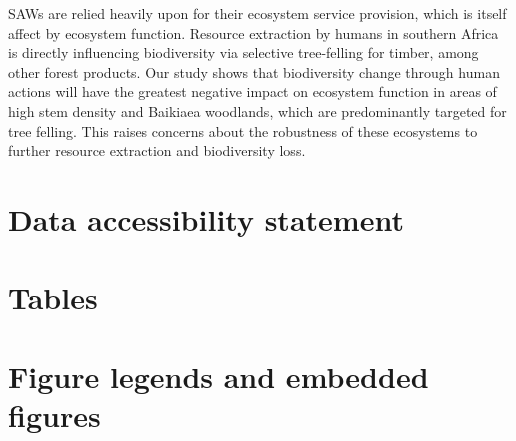 \documentclass[11pt,a4paper]{article}
\begin{document}
SAWs are relied heavily upon for their ecosystem service provision, which is itself affect by ecosystem function. Resource extraction by humans in southern Africa is directly influencing biodiversity via selective tree-felling for timber, among other forest products. Our study shows that biodiversity change through human actions will have the greatest negative impact on ecosystem function in areas of high stem density and Baikiaea woodlands, which are predominantly targeted for tree felling. This raises concerns about the robustness of these ecosystems to further resource extraction and biodiversity loss.




\newpage{}
\appendix{}

\section*{Data accessibility statement}

\section*{Tables}

\section*{Figure legends and embedded figures}
\end{document}
